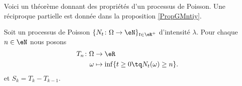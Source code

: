 Voici un théorème donnant des propriétés d'un processus de Poisson. Une réciproque partielle est donnée dans la proposition \ref{PropGMntiy}.
\begin{theorem}     \label{THOooYRIMooSREVEO}
    Soit un processus de Poisson \(  \{ N_t\colon \Omega\to \eN \}_{t\in \eR^+}  \) d'intensité \( \lambda\). Pour chaque \( n\in \eN\) nous posons
    \begin{equation}
        \begin{aligned}
            T_n\colon \Omega&\to \eR \\
            \omega&\mapsto \inf\{ t\geq 0\tq N_t(\omega)\geq n \}. 
        \end{aligned}
    \end{equation}
    et \( S_k=T_k-T_{k-1}\).



\end{theorem}
